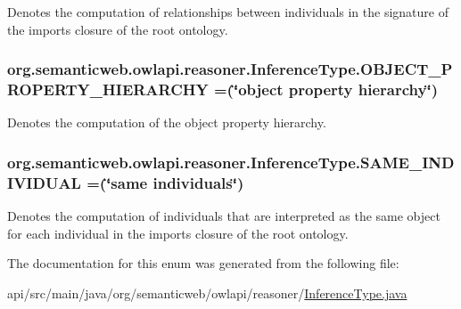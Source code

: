 Denotes the computation of relationships between individuals in the signature of the imports closure of the root ontology. \hypertarget{enumorg_1_1semanticweb_1_1owlapi_1_1reasoner_1_1_inference_type_aeae299f44074d86395601f75eb712b80}{
\subsubsection[{O\-B\-J\-E\-C\-T\-\_\-\-P\-R\-O\-P\-E\-R\-T\-Y\-\_\-\-H\-I\-E\-R\-A\-R\-C\-H\-Y}]{\setlength{\rightskip}{0pt plus 5cm}org.\-semanticweb.\-owlapi.\-reasoner.\-Inference\-Type.\-O\-B\-J\-E\-C\-T\-\_\-\-P\-R\-O\-P\-E\-R\-T\-Y\-\_\-\-H\-I\-E\-R\-A\-R\-C\-H\-Y =(\char`\"{}object property hierarchy\char`\"{})}}\label{enumorg_1_1semanticweb_1_1owlapi_1_1reasoner_1_1_inference_type_aeae299f44074d86395601f75eb712b80}
Denotes the computation of the object property hierarchy. \hypertarget{enumorg_1_1semanticweb_1_1owlapi_1_1reasoner_1_1_inference_type_a2b63264f556fe54ff2106bf9dffe905e}{
\subsubsection[{S\-A\-M\-E\-\_\-\-I\-N\-D\-I\-V\-I\-D\-U\-A\-L}]{\setlength{\rightskip}{0pt plus 5cm}org.\-semanticweb.\-owlapi.\-reasoner.\-Inference\-Type.\-S\-A\-M\-E\-\_\-\-I\-N\-D\-I\-V\-I\-D\-U\-A\-L =(\char`\"{}same individuals\char`\"{})}}\label{enumorg_1_1semanticweb_1_1owlapi_1_1reasoner_1_1_inference_type_a2b63264f556fe54ff2106bf9dffe905e}
Denotes the computation of individuals that are interpreted as the same object for each individual in the imports closure of the root ontology. 

The documentation for this enum was generated from the following file\-:\begin{DoxyCompactItemize}
\item 
api/src/main/java/org/semanticweb/owlapi/reasoner/\hyperlink{_inference_type_8java}{Inference\-Type.\-java}\end{DoxyCompactItemize}
